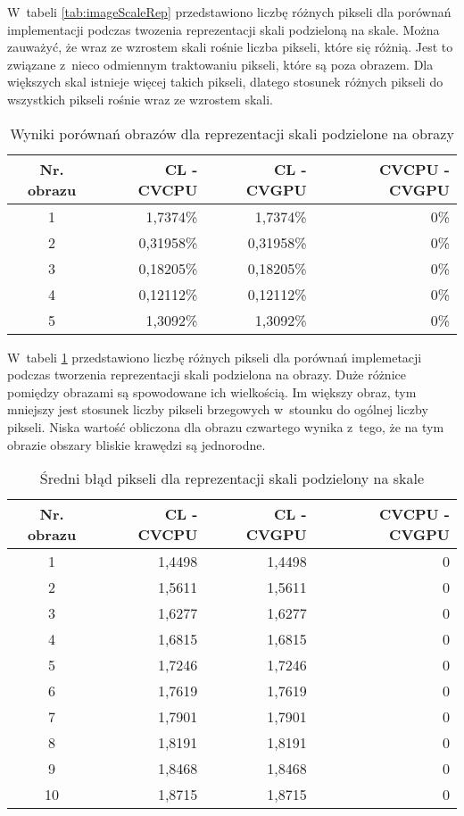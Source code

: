 W~tabeli \ref{tab:imageScaleRep} przedstawiono liczbę różnych pikseli dla porównań implementacji podczas twozenia reprezentacji skali podzieloną na skale. Można zauważyć, że wraz ze wzrostem skali rośnie liczba pikseli, które się różnią. Jest to związane z~nieco odmiennym traktowaniu pikseli, które są poza obrazem. Dla większych skal istnieje więcej takich pikseli, dlatego stosunek różnych pikseli do wszystkich pikseli rośnie wraz ze wzrostem skali.

\begin{center}
\begin{table}
\centering
\caption{Wyniki porównań obrazów dla reprezentacji skali podzielone na obrazy}
\label{tab:imageImageRep}
\begin{tabular}{|c|r|r|r|}
\hline
Nr. obrazu & CL - CVCPU & CL - CVGPU & CVCPU - CVGPU \\ \hline
1 & 1,7374\% & 1,7374\% & 0\% \\ \hline
2 & 0,31958\% & 0,31958\% & 0\% \\ \hline
3 & 0,18205\% & 0,18205\% & 0\% \\ \hline
4 & 0,12112\% & 0,12112\% & 0\% \\ \hline
5 & 1,3092\% & 1,3092\% & 0\% \\ \hline
\end{tabular}
\end{table}
\end{center}

W~tabeli \ref{tab:imageImageRep} przedstawiono liczbę różnych pikseli dla porównań implemetacji podczas tworzenia reprezentacji skali podzielona na obrazy. Duże różnice pomiędzy obrazami są spowodowane ich wielkością. Im większy obraz, tym mniejszy jest stosunek liczby pikseli brzegowych w~stounku do ogólnej liczby pikseli. Niska wartość obliczona dla obrazu czwartego wynika z~tego, że na tym obrazie obszary bliskie krawędzi są jednorodne.

\begin{center}
\begin{table}
\centering
\caption{Średni błąd pikseli dla reprezentacji skali podzielony na skale}
\label{tab:devScaleRep}
\begin{tabular}{|c|r|r|r|}
\hline
Nr. obrazu & CL - CVCPU & CL - CVGPU & CVCPU - CVGPU \\ \hline
1 & 1,4498 & 1,4498 & 0 \\ \hline
2 & 1,5611 & 1,5611 & 0 \\ \hline
3 & 1,6277 & 1,6277 & 0 \\ \hline
4 & 1,6815 & 1,6815 & 0 \\ \hline
5 & 1,7246 & 1,7246 & 0 \\ \hline
6 & 1,7619 & 1,7619 & 0 \\ \hline
7 & 1,7901 & 1,7901 & 0 \\ \hline
8 & 1,8191 & 1,8191 & 0 \\ \hline
9 & 1,8468 & 1,8468 & 0 \\ \hline
10 & 1,8715 & 1,8715 & 0 \\ \hline
\end{tabular}
\end{table}
\end{center}

